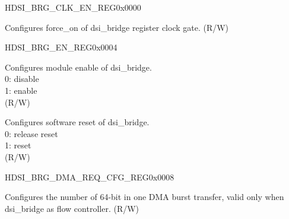 \begin{register}{H}{DSI\_BRG\_CLK\_EN\_REG}{0x0000}\label{regdesc:DSIBRGCLKENREG}
%
%
\regnewline%
\begin{regdesc}\begin{reglist}
\label{fielddesc:DSIBRGCLKEN}\item [DSI\_BRG\_CLK\_EN] Configures force\_on of dsi\_bridge register clock gate. (R/W)
\end{reglist}\end{regdesc}
\end{register}


\begin{register}{H}{DSI\_BRG\_EN\_REG}{0x0004}\label{regdesc:DSIBRGENREG}
%
%
%
\regnewline%
\begin{regdesc}\begin{reglist}
\label{fielddesc:DSIBRGDSIEN}\item [DSI\_BRG\_DSI\_EN] Configures module enable of dsi\_bridge.\\0: disable\\1: enable\\(R/W)
\label{fielddesc:DSIBRGDSIBRIGRST}\item [DSI\_BRG\_DSI\_BRIG\_RST] Configures software reset of dsi\_bridge.\\0: release reset\\1: reset\\(R/W)
\end{reglist}\end{regdesc}
\end{register}


\begin{register}{H}{DSI\_BRG\_DMA\_REQ\_CFG\_REG}{0x0008}\label{regdesc:DSIBRGDMAREQCFGREG}
%
%
\regnewline%
\begin{regdesc}\begin{reglist}
\label{fielddesc:DSIBRGDMABURSTLEN}\item [DSI\_BRG\_DMA\_BURST\_LEN] Configures the number of 64-bit in one DMA burst transfer, valid only when dsi\_bridge as flow controller. (R/W)
\end{reglist}\end{regdesc}
\end{register}


